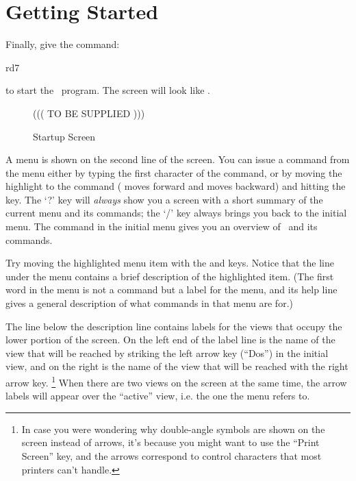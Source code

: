 \section{Getting Started}

Finally, give the command:
\begin{dcode}
rd7
\end{dcode}
\noindent
to start the \RD\ program.  The screen will look like .
 
\begin{figure}[tbp]

\vspace{1.25in}
((( TO BE SUPPLIED )))
\vspace{1.25in}
 
\caption{Startup Screen}
\label{fig-startup}
\end{figure}


 
A menu is shown on the second line of the screen.  You can issue a
command from the menu either by typing the first character of the
command, or by moving the highlight to the command ( moves
forward and  moves backward) and hitting the 
key.  The `?' key will {\em always} show you a screen with a
short summary of the current menu and its commands; the `/' key
always brings you back to the initial menu.  The 
command in the initial menu gives you an overview of \RD\ and its
commands.
 
Try moving the highlighted menu item with the  and
 keys.  Notice that the line under the menu contains a
brief description of the highlighted item.  (The first word in the
menu is not a command but a label for the menu, and its help line
gives a general description of what commands in that menu are for.)

The line below the description line contains labels for the views
that occupy the lower portion of the screen.  On the left end of the
label line is the name of the view that will be reached by striking
the left arrow key (``Dos'') in the initial view, and on the right is
the name of the view that will be reached with the right arrow key.%
\footnote{In case you were wondering why double-angle symbols are
shown on the screen instead of arrows, it's because you might want to
use the ``Print Screen'' key, and the arrows correspond to control
characters that most printers can't handle.}  When there are two
views on the screen at the same time, the arrow labels will appear
over the ``active'' view, i.e. the one the menu refers to.

